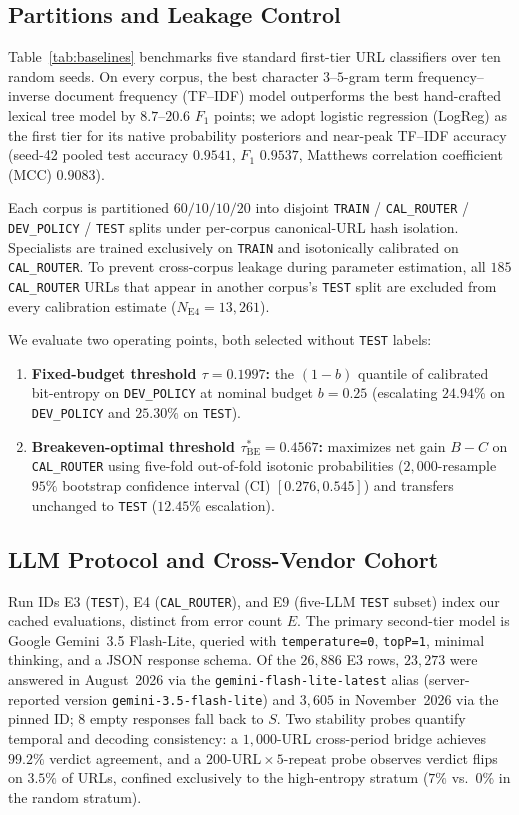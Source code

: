 \documentclass[conference,a4paper]{IEEEtran}
\begin{document}
\subsection{Partitions and Leakage Control}
Table~\ref{tab:baselines} benchmarks five standard first-tier URL classifiers over
ten random seeds. On every corpus, the best character $3$--$5$-gram term
frequency--inverse document frequency (TF--IDF) model
outperforms the best hand-crafted lexical tree model by $8.7$--$20.6$ $F_1$ points;
we adopt logistic regression (LogReg) as the first tier for its native probability
posteriors and near-peak TF--IDF accuracy (seed-42 pooled test accuracy $0.9541$,
$F_1$ $0.9537$, Matthews correlation coefficient (MCC) $0.9083$).

Each corpus is partitioned $60/10/10/20$ into disjoint \texttt{TRAIN} /
\texttt{CAL\_ROUTER} / \texttt{DEV\_POLICY} / \texttt{TEST} splits under per-corpus
canonical-URL hash isolation. Specialists are trained exclusively on \texttt{TRAIN}
and isotonically calibrated on \texttt{CAL\_ROUTER}. To prevent cross-corpus leakage
during parameter estimation, all $185$ \texttt{CAL\_ROUTER} URLs that appear in
another corpus's \texttt{TEST} split are excluded from every calibration estimate
($N_{\mathrm{E4}}=13{,}261$).

We evaluate two operating points, both selected without \texttt{TEST} labels:
\begin{enumerate}
\item \textbf{Fixed-budget threshold $\tau=0.1997$:} the $(1-b)$ quantile of
calibrated bit-entropy on \texttt{DEV\_POLICY} at nominal budget $b=0.25$ (escalating
$24.94\%$ on \texttt{DEV\_POLICY} and $25.30\%$ on \texttt{TEST}).
\item \textbf{Breakeven-optimal threshold $\tau^{\ast}_{\mathrm{BE}}=0.4567$:}
maximizes net gain $B-C$ on \texttt{CAL\_ROUTER} using five-fold out-of-fold
isotonic probabilities ($2{,}000$-resample $95\%$ bootstrap confidence interval (CI)
$[0.276, 0.545]$) and transfers unchanged to \texttt{TEST} ($12.45\%$ escalation).
\end{enumerate}

\subsection{LLM Protocol and Cross-Vendor Cohort}
Run IDs E3 (\texttt{TEST}), E4 (\texttt{CAL\_ROUTER}), and E9 (five-LLM \texttt{TEST}
subset) index our cached evaluations, distinct from error count $E$.
The primary second-tier model is Google Gemini~3.5 Flash-Lite, queried with
\texttt{temperature=0}, \texttt{topP=1}, minimal thinking, and a JSON response
schema. Of the $26{,}886$ E3 rows, $23{,}273$ were answered in August~2026 via the
\texttt{gemini-flash-lite-latest} alias (server-reported version
\texttt{gemini-3.5-flash-lite}) and $3{,}605$ in November~2026 via the pinned ID;
$8$ empty responses fall back to $S$. Two stability probes quantify temporal and
decoding consistency: a $1{,}000$-URL cross-period bridge achieves $99.2\%$ verdict
agreement, and a $200\text{-URL}\times 5\text{-repeat}$ probe observes verdict flips
on $3.5\%$ of URLs, confined exclusively to the high-entropy stratum ($7\%$ vs.\
$0\%$ in the random stratum).
\end{document}
